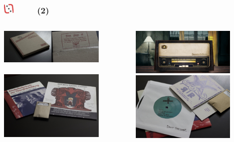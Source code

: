 \documentclass[slidetop,11pt]{beamer}
\def\moreInFrameTitleLeftt{\includegraphics[height=0.5cm]{img/ligueludique-0.png}~~~~~}
\begin{document}
\begin{frame}
	\frametitle{\moreInFrameTitleLeftt \sectionPartIIaVIII  (2) }
	\begin{columns}[T]
		\begin{column}[T]{5.05cm}
			\includegraphics[width=5.00cm]{img/ResistanceRadio/electronica-musikanten.jpg}~\\
			~\\
			\includegraphics[width=5.00cm]{img/ResistanceRadio/resistance-radio-reich-small.jpg}~\\
		\end{column}
		\begin{column}[T]{5.05cm}
			\includegraphics[width=5.00cm]{img/ResistanceRadio/resistance-radio-image.jpg}~\\
			
			\includegraphics[width=5.00cm]{img/ResistanceRadio/resistance-radio-secret-contents-small.jpg}~\\
		\end{column}
	\end{columns}
\end{frame}
\end{document}
